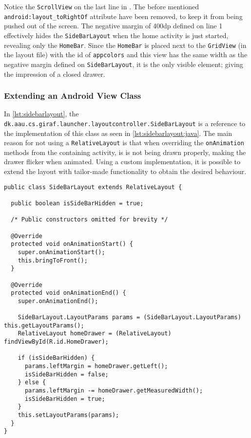 Notice the \lstinline|ScrollView| on the last line in .
The before mentioned \lstinline{android:layout_toRightOf} attribute have been removed, to keep it from being pushed out of the screen.
The negative margin of 400dp defined on line 1 effectively hides the \lstinline|SideBarLayout| when the home activity is just started, revealing only the \lstinline|HomeBar|.
Since the \lstinline|HomeBar| is placed next to the \lstinline|GridView| (in the layout file) with the id of \lstinline!appcolors! and this view has the same width as the negative margin defined on \lstinline|SideBarLayout|, it is the only visible element; giving the impression of a closed drawer.

\subsubsection{Extending an Android View Class}\label{sec:siebarlayout:java}
In \cref{lst:sidebarlayout}, the \lstinline|dk.aau.cs.giraf.launcher.layoutcontroller.SideBarLayout| is a reference to the implementation of this class as seen in \cref{lst:sidebarlayout:java}.
The main reason for not using a \lstinline|RelativeLayout| is that when overriding the \lstinline|onAnimation| methods from the containing activity, is is not being drawn properly, making the drawer flicker when animated.
Using a custom implementation, it is possible to extend the layout with tailor-made functionality to obtain the desired behaviour.

\begin{lstlisting}[caption={Extending the Android \lstinline|RelativeLayout| class.},label={lst:sidebarlayout:java}]
public class SideBarLayout extends RelativeLayout {
  
  public boolean isSideBarHidden = true;
  
  /* Public constructors omitted for brevity */
  
  @Override
  protected void onAnimationStart() {
    super.onAnimationStart();
    this.bringToFront();
  }
  
  @Override
  protected void onAnimationEnd() {
    super.onAnimationEnd();

    SideBarLayout.LayoutParams params = (SideBarLayout.LayoutParams) this.getLayoutParams();
    RelativeLayout homeDrawer = (RelativeLayout) findViewById(R.id.HomeDrawer);

    if (isSideBarHidden) {
      params.leftMargin = homeDrawer.getLeft();
      isSideBarHidden = false;
    } else {
      params.leftMargin -= homeDrawer.getMeasuredWidth();
      isSideBarHidden = true;
    }
    this.setLayoutParams(params);
  }
}
\end{lstlisting}

